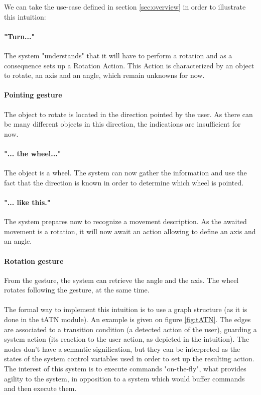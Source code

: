 \documentclass[a4paper]{article}
\begin{document}
We can take the use-case defined in section \ref{sec:overview} in order to illustrate this intuition:

\paragraph{"Turn..."} The system "understands" that it will have to perform a rotation and as a consequence sets up a Rotation Action. This Action is characterized by an object to rotate, an axis and an angle, which remain unknowns for now.

\paragraph{Pointing gesture} The object to rotate is located in the direction pointed by the user. As there can be many different objects in this direction, the indications are insufficient for now.

\paragraph{"... the wheel..."} The object is a wheel. The system can now gather the information and use the fact that the direction is known in order to determine which wheel is pointed.

\paragraph{"... like this."} The system prepares now to recognize a movement description. As the awaited movement is a rotation, it will now await an action allowing to define an axis and an angle.

\paragraph{Rotation gesture} From the gesture, the system can retrieve the angle and the axis. The wheel rotates following the gesture, at the same time.
\\
\\
The formal way to implement this intuition is to use a graph structure (as it is done in the tATN module). An example is given on figure \ref{fig:tATN}. The edges are associated to a transition condition (a detected action of the user), guarding a system action (its reaction to the user action, as depicted in the intuition). The nodes don't have a semantic signification, but they can be interpreted as the states of the system control variables used in order to set up the resulting action. The interest of this system is to execute commands "on-the-fly", what provides agility to the system, in opposition to a system which would buffer commands and then execute them.
\end{document}
